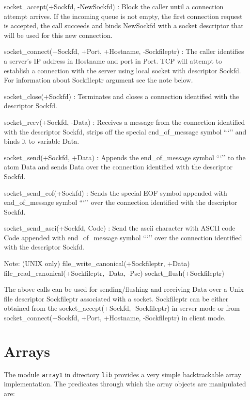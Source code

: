 {socket_accept(+Sockfd, -NewSockfd) :
Block the caller until a connection attempt arrives. If the incoming queue is
not empty, the first connection request is accepted, the call succeeds and
binds NewSockfd with a socket descriptor that will be used for this new
connection.

socket_connect(+Sockfd, +Port, +Hostname, -Sockfileptr) :
The caller identifies a server's IP address in Hostname and port in Port.
TCP will attempt to establish a connection with the server using local socket
with descriptor Sockfd. For information about Sockfileptr argument see the
note below.

socket_close(+Sockfd) :
Terminates and closes a connection identified with the descriptor Sockfd.

socket_recv(+Sockfd, -Data) :
Receives a message from the connection identified with the descriptor Sockfd,
strips off the special end_of_message symbol ```'' and binds it to variable Data.

socket_send(+Sockfd, +Data) :
Appends the end_of_message symbol ```'' to the atom Data and sends Data over
the connection identified with the descriptor Sockfd.

socket_send_eof(+Sockfd) :
Sends the special EOF symbol appended with end_of_message symbol ```'' over
the connection identified with the descriptor Sockfd.

socket_send_asci(+Sockfd, Code) :
Send the ascii character with ASCII code Code appended with end_of_message
symbol ```''  over the connection identified with the descriptor Sockfd.


Note: (UNIX only) file_write_canonical(+Sockfileptr, +Data)
		  file_read_canonical(+Sockfileptr, -Data, -Psc) 
		  socket_flush(+Sockfileptr)

The above calls can be used for sending/flushing and receiving Data over a
Unix file descriptor Sockfileptr associated with a socket. Sockfileptr can be
either obtained from the socket_accept(+Sockfd, -Sockfileptr) in server mode
or from socket_connect(+Sockfd, +Port, +Hostname, -Sockfileptr) in client mode.

}

\section{Arrays}

The module {\tt array1} in directory {\tt lib} provides a very simple 
backtrackable array implementation.  The predicates through which the 
array objects are manipulated are:

